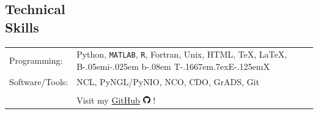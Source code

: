 \documentclass[margin,line,palatino,courier,10pt]{res}
\def\BibTeX{{\rm B\kern-.05em{\sc i\kern-.025em b}\kern-.08em
    T\kern-.1667em\lower.7ex\hbox{E}\kern-.125emX}}
\begin{document}
\begin{resume}

\section{\sc \textcolor{Cerulean}{\large{\textbf{Technical \\ Skills}}}}
\vspace*{0.05in}
\begin{tabular}{@{}p{0.9in}p{6in}}

Programming:& Python, \texttt{MATLAB}, \texttt{R}, Fortran, Unix, HTML, \TeX, \LaTeX, \BibTeX \\
Software/Tools: & NCL, PyNGL/PyNIO, NCO, CDO, GrADS, Git\\\\

& Visit my \href{https://github.com/zmlabe}{GitHub} \includegraphics[height=9pt]{github.png} !\\
\end{tabular}

\noindent\textcolor{Cerulean}{\makebox[\linewidth][r]{\rule{\textwidth}{5pt}}}

\end{resume}
\end{document}
